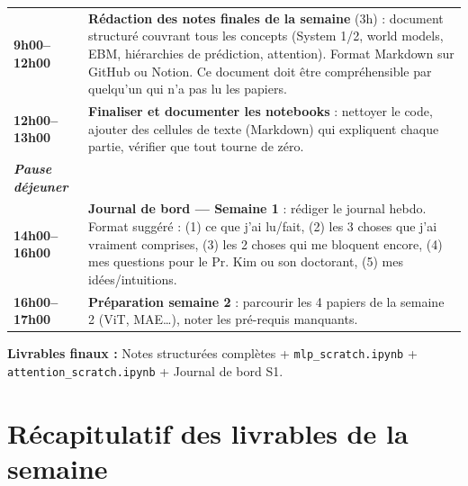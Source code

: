 \documentclass[a4paper,11pt]{article}
\begin{document}
\begin{tcolorbox}[daybox, title={Vendredi — Synthèse \& Livrables finaux (7h)}]
\renewcommand{\arraystretch}{1.4}
\begin{tabularx}{\textwidth}{>{\bfseries\color{jepaBlue}}p{2.2cm} X}
  9h00–12h00  & \textbf{Rédaction des notes finales de la semaine} (3h) : document structuré couvrant tous les concepts (System 1/2, world models, EBM, hiérarchies de prédiction, attention). Format Markdown sur GitHub ou Notion. Ce document doit être compréhensible par quelqu'un qui n'a pas lu les papiers. \\
  12h00–13h00 & \textbf{Finaliser et documenter les notebooks} : nettoyer le code, ajouter des cellules de texte (Markdown) qui expliquent chaque partie, vérifier que tout tourne de zéro. \\
  \textit{Pause déjeuner} & \\
  14h00–16h00 & \textbf{Journal de bord — Semaine 1} : rédiger le journal hebdo. Format suggéré : (1) ce que j'ai lu/fait, (2) les 3 choses que j'ai vraiment comprises, (3) les 2 choses qui me bloquent encore, (4) mes questions pour le Pr. Kim ou son doctorant, (5) mes idées/intuitions. \\
  16h00–17h00 & \textbf{Préparation semaine 2} : parcourir les 4 papiers de la semaine 2 (ViT, MAE…), noter les pré-requis manquants. \\
\end{tabularx}

\vspace{0.3cm}
\textbf{\color{successGreen} Livrables finaux :} Notes structurées complètes + \texttt{mlp\_scratch.ipynb} + \texttt{attention\_scratch.ipynb} + Journal de bord S1.
\end{tcolorbox}

\newpage

\section{Récapitulatif des livrables de la semaine}
\end{document}
